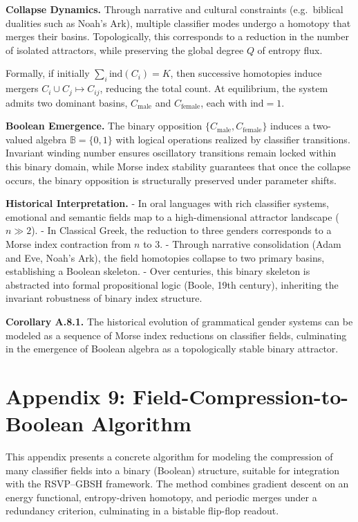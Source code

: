 \documentclass[11pt]{article}
\theoremstyle{plain}
\begin{document}
\textbf{Collapse Dynamics.}  
Through narrative and cultural constraints (e.g.\ biblical dualities such as
Noah’s Ark), multiple classifier modes undergo a homotopy that merges their
basins. Topologically, this corresponds to a reduction in the number of
isolated attractors, while preserving the global degree $Q$ of entropy flux.

Formally, if initially $\sum_i \mathrm{ind}(C_i)=K$, then successive
homotopies induce mergers $C_i \cup C_j \mapsto C_{ij}$, reducing the total
count. At equilibrium, the system admits two dominant basins, $C_\text{male}$
and $C_\text{female}$, each with $\mathrm{ind}=1$.

\textbf{Boolean Emergence.}  
The binary opposition $\{C_\text{male},C_\text{female}\}$ induces a
two-valued algebra $\mathbb{B}=\{0,1\}$ with logical operations realized by
classifier transitions. Invariant winding number ensures oscillatory
transitions remain locked within this binary domain, while Morse index
stability guarantees that once the collapse occurs, the binary opposition is
structurally preserved under parameter shifts.

\textbf{Historical Interpretation.}  
- In oral languages with rich classifier systems, emotional and semantic fields
map to a high-dimensional attractor landscape ($n\gg 2$).  
- In Classical Greek, the reduction to three genders corresponds to a Morse
index contraction from $n$ to $3$.  
- Through narrative consolidation (Adam and Eve, Noah’s Ark), the field
homotopies collapse to two primary basins, establishing a Boolean skeleton.  
- Over centuries, this binary skeleton is abstracted into formal propositional
logic (Boole, 19th century), inheriting the invariant robustness of binary
index structure.

\medskip

\textbf{Corollary A.8.1.}  
The historical evolution of grammatical gender systems can be modeled as a
sequence of Morse index reductions on classifier fields, culminating in the
emergence of Boolean algebra as a topologically stable binary attractor.

\section{Appendix 9: Field-Compression-to-Boolean Algorithm}

This appendix presents a concrete algorithm for modeling the compression of many classifier fields into a binary (Boolean) structure, suitable for integration with the RSVP--GBSH framework. The method combines gradient descent on an energy functional, entropy-driven homotopy, and periodic merges under a redundancy criterion, culminating in a bistable flip-flop readout.
\end{document}
